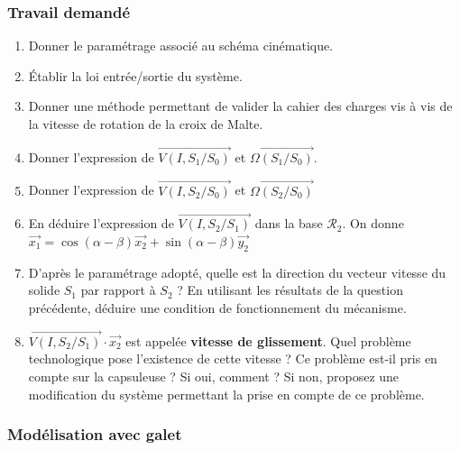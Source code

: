 \subsubsection{Travail demandé}

\begin{enumerate}
\item Donner le paramétrage associé au schéma cinématique.
\item \'Etablir la loi entrée/sortie du système.
\item Donner une méthode permettant de valider la cahier des charges vis à vis de la vitesse de rotation de la croix de Malte.
\item Donner l'expression de $\overrightarrow{V(I,S_1/S_0)}$ et $\overrightarrow{\Omega(S_1/S_0)}$.
\item Donner l'expression de $\overrightarrow{V(I,S_2/S_0)}$ et $\overrightarrow{\Omega(S_2/S_0)}$
\item En déduire l'expression de $\overrightarrow{V(I,S_2/S_1)}$ dans la base $\mathcal{R}_2$. On donne $ \overrightarrow{x_1} 
=\cos(\alpha-\beta)\overrightarrow{x_2} + \sin(\alpha-\beta)\overrightarrow{y_2}$
\item D'après le paramétrage adopté, quelle est la direction du vecteur vitesse du solide $S_1$ par rapport à $S_2$ ? %
En utilisant les résultats de la question précédente, déduire une condition de fonctionnement du mécanisme.
\item $\overrightarrow{V(I,S_2/S_1)}\cdot\overrightarrow{x_2}$ est appelée \textbf{vitesse de glissement}. Quel problème technologique pose l'existence de cette vitesse ? Ce problème est-il pris en compte sur la capsuleuse ? Si oui, comment ? Si non, proposez une modification du système permettant la prise en compte de ce problème.
\end{enumerate}

\subsubsection{Modélisation avec galet}

